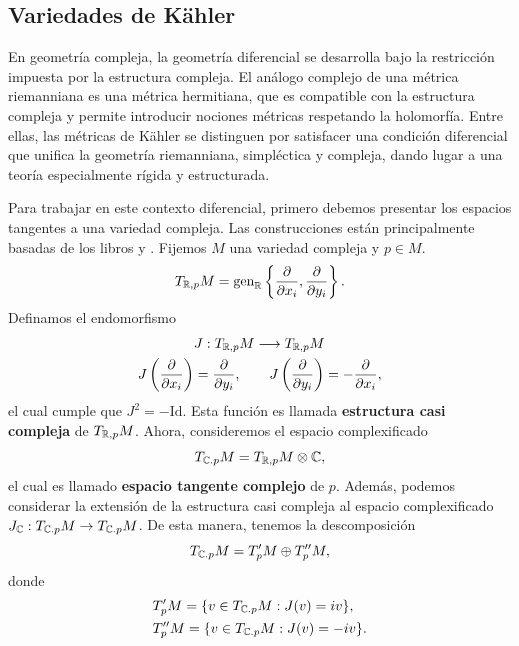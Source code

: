 \subsection{Variedades de Kähler}

En geometría compleja, la geometría diferencial se desarrolla bajo la restricción impuesta por la estructura compleja. El análogo complejo de una métrica riemanniana es una métrica hermitiana, que es compatible con la estructura compleja y permite introducir nociones métricas respetando la holomorfía. Entre ellas, las métricas de Kähler se distinguen por satisfacer una condición diferencial que unifica la geometría riemanniana, simpléctica y compleja, dando lugar a una teoría especialmente rígida y estructurada.

Para trabajar en este contexto diferencial, primero debemos presentar los espacios tangentes a una variedad compleja. Las construcciones están principalmente basadas de los libros \parencite[Sec. 1.2]{huybrechts2005complex} y \parencite[Cap. 1]{leecomplex}. Fijemos $M$ una variedad compleja y $p\in M$. 
\begin{equation*}
	T_{\mathbb{R},p}M=\mathrm{gen}_{\mathbb{R}}\left\{\frac{\partial}{\partial x_i},\frac{\partial}{\partial y_i}\right\}.
\end{equation*} 
Definamos el endomorfismo
\begin{align*}
	&J:T_{\mathbb{R},p}M\longrightarrow T_{\mathbb{R},p}M\\
	J\left(\frac{\partial}{\partial x_i}  \right)&=\frac{\partial}{\partial y_i},\qquad J\left(\frac{\partial}{\partial y_i} \right)=-\frac{\partial}{\partial x_i},
\end{align*}
el cual cumple que $J^2=-\mathrm{Id}$. Esta función es llamada \textbf{estructura casi compleja} de $T_{\mathbb{R},p}M$. Ahora, consideremos el espacio complexificado
\begin{equation*}
	T_{\mathbb{C}.p}M=T_{\mathbb{R},p}M\otimes \mathbb{C},
\end{equation*}
el cual es llamado \textbf{espacio tangente complejo} de $p$. Además, podemos considerar la extensión de la estructura casi compleja al espacio complexificado $J_{\mathbb{C}}:T_{\mathbb{C}.p}M\to T_{\mathbb{C}.p}M$. De esta manera, tenemos la descomposición
\begin{equation*}
	T_{\mathbb{C}.p}M=T_{p}^\prime M\oplus T_p^{\prime\prime}M, 
\end{equation*}
donde
\begin{align*}
	&T_{p}^\prime M=\{v\in T_{\mathbb{C}.p}M: J(v)=iv\},\\		&T_p^{\prime\prime}M =\{v\in T_{\mathbb{C}.p}M: J(v)=-iv\}.
\end{align*}
